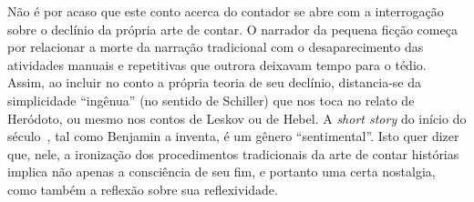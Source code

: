 Não é por acaso que este conto acerca do contador se abre com a
interrogação sobre o declínio da própria arte de contar. O narrador da
pequena ficção começa por relacionar a morte da narração tradicional com
o desaparecimento das atividades manuais e repetitivas que outrora
deixavam tempo para o tédio. Assim, ao incluir no conto a própria teoria
de seu declínio, distancia-se da simplicidade ``ingênua'' (no sentido de
Schiller) que nos toca no relato de Heródoto, ou mesmo nos contos de
Leskov ou de Hebel. A \emph{short story} do início do século~, tal
como Benjamin a inventa, é um gênero ``sentimental''. Isto quer dizer
que, nele, a ironização dos procedimentos tradicionais da arte de contar
histórias implica não apenas a consciência de seu fim, e portanto uma
certa nostalgia, como também a reflexão sobre sua reflexividade.
